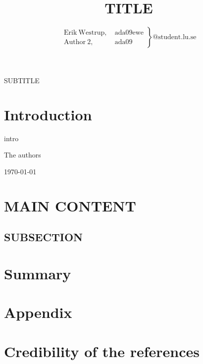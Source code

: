 \documentclass[10pt,journal,compsoc,final,twoside,twocolumn,a4paper]{IEEEtran}
\begin{document}
\title{TITLE}

\author{%
\begin{math}
\left. \begin{array}{ll} 
	\mathrm{Erik~Westrup,} & \mathrm{~ada09ewe} \\
	\mathrm{Author~2,} & \mathrm{~ada09}
\end{array} \right\}\mathrm{@student.lu.se}
\end{math}
}

{SUBTITLE}

\maketitle
\IEEEdisplaynotcompsoctitleabstractindextext%
\IEEEpeerreviewmaketitle%

\section{Introduction}

 intro


\hfill The authors

\hfill \today


\section{MAIN CONTENT}
\lipsum[1-2]

\subsection{SUBSECTION}
\lipsum[1]

\section{Summary}




\newpage
\section*{Appendix}
\appendices%
\section{Credibility of the references}

\emph{\cite{dummy:ref}} 
\end{document}

